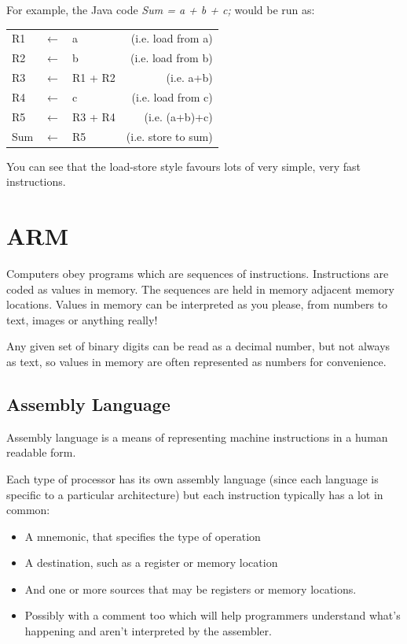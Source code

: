 For example, the Java code {\it Sum = a + b + c;} would be run as:

\begin{center}
    \begin{tabular}{l l l r}
        R1 & $\leftarrow$ & a & (i.e. load from a)\\
        R2 & $\leftarrow$ & b & (i.e. load from b)\\
        R3 & $\leftarrow$ & R1 + R2 & (i.e. a+b)\\
        R4 & $\leftarrow$ & c & (i.e. load from c)\\
        R5 & $\leftarrow$ & R3 + R4  & (i.e. (a+b)+c)\\
        Sum & $\leftarrow$ & R5 & (i.e. store to sum)\\
    \end{tabular}
\end{center}

You can see that the load-store style favours lots of very simple, very fast instructions.

\section{ARM}
Computers obey programs which are sequences of instructions. Instructions are coded as values in memory. The sequences are held in memory adjacent memory locations. Values in memory can be interpreted as you please, from numbers to text, images or anything really!

Any given set of binary digits can be read as a decimal number, but not always as text, so values in memory are often represented as numbers for convenience.

\subsection{Assembly Language}
Assembly language is a means of representing machine instructions in a human readable form.

Each type of processor has its own assembly language (since each language is
specific to a particular architecture) but each instruction typically has a lot
in common:

\begin{itemize}
	\item A mnemonic, that specifies the type of operation
	\item A destination, such as a register or memory location
	\item And one or more sources that may be registers or memory locations.
	\item Possibly with a comment too which will help programmers understand what's happening and aren't interpreted by the assembler.
\end{itemize}

